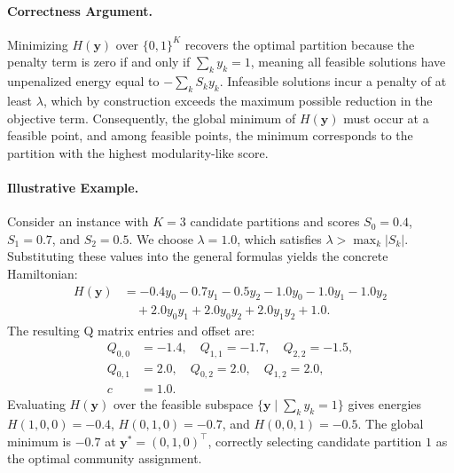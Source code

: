 \documentclass[12pt]{article}
\begin{document}
\paragraph{Correctness Argument.}
Minimizing $H(\mathbf{y})$ over $\{0,1\}^K$ recovers the optimal partition because the penalty term is zero if and only if $\sum_k y_k = 1$, meaning all feasible solutions have unpenalized energy equal to $-\sum_k S_k y_k$. Infeasible solutions incur a penalty of at least $\lambda$, which by construction exceeds the maximum possible reduction in the objective term. Consequently, the global minimum of $H(\mathbf{y})$ must occur at a feasible point, and among feasible points, the minimum corresponds to the partition with the highest modularity-like score.

\paragraph{Illustrative Example.}
Consider an instance with $K=3$ candidate partitions and scores $S_0 = 0.4$, $S_1 = 0.7$, and $S_2 = 0.5$. We choose $\lambda = 1.0$, which satisfies $\lambda > \max_k |S_k|$. Substituting these values into the general formulas yields the concrete Hamiltonian:
\begin{align}
    H(\mathbf{y}) &= -0.4 y_0 - 0.7 y_1 - 0.5 y_2 - 1.0 y_0 - 1.0 y_1 - 1.0 y_2 \nonumber \\
    &\quad + 2.0 y_0 y_1 + 2.0 y_0 y_2 + 2.0 y_1 y_2 + 1.0.
\end{align}
The resulting Q matrix entries and offset are:
\begin{align}
    Q_{0,0} &= -1.4, \quad Q_{1,1} = -1.7, \quad Q_{2,2} = -1.5, \\
    Q_{0,1} &= 2.0, \quad Q_{0,2} = 2.0, \quad Q_{1,2} = 2.0, \\
    c &= 1.0.
\end{align}
Evaluating $H(\mathbf{y})$ over the feasible subspace $\{ \mathbf{y} \mid \sum_k y_k = 1 \}$ gives energies $H(1,0,0) = -0.4$, $H(0,1,0) = -0.7$, and $H(0,0,1) = -0.5$. The global minimum is $-0.7$ at $\mathbf{y}^* = (0,1,0)^\top$, correctly selecting candidate partition $1$ as the optimal community assignment.
\end{document}
